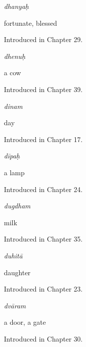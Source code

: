 \noindent\begin{minipage}[t]{\linewidth}
\raggedright
\textbf{}\enspace\emph{dhanyaḥ}\par
\small fortunate, blessed\par
\footnotesize Introduced in Chapter 29.
\end{minipage}\par\medskip

\noindent\begin{minipage}[t]{\linewidth}
\raggedright
\textbf{}\enspace\emph{dhenuḥ}\par
\small a cow\par
\footnotesize Introduced in Chapter 39.
\end{minipage}\par\medskip

\noindent\begin{minipage}[t]{\linewidth}
\raggedright
\textbf{}\enspace\emph{dinam}\par
\small day\par
\footnotesize Introduced in Chapter 17.
\end{minipage}\par\medskip

\noindent\begin{minipage}[t]{\linewidth}
\raggedright
\textbf{}\enspace\emph{dīpaḥ}\par
\small a lamp\par
\footnotesize Introduced in Chapter 24.
\end{minipage}\par\medskip

\noindent\begin{minipage}[t]{\linewidth}
\raggedright
\textbf{}\enspace\emph{dugdham}\par
\small milk\par
\footnotesize Introduced in Chapter 35.
\end{minipage}\par\medskip

\noindent\begin{minipage}[t]{\linewidth}
\raggedright
\textbf{}\enspace\emph{duhitā}\par
\small daughter\par
\footnotesize Introduced in Chapter 23.
\end{minipage}\par\medskip

\noindent\begin{minipage}[t]{\linewidth}
\raggedright
\textbf{}\enspace\emph{dvāram}\par
\small a door, a gate\par
\footnotesize Introduced in Chapter 30.
\end{minipage}\par\medskip

